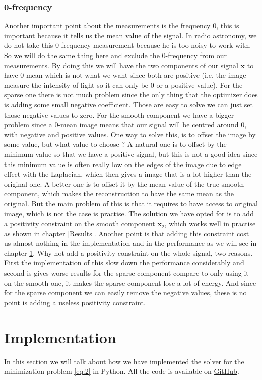 \documentclass[a4paper,11pt,oneside]{report}
\theoremstyle{named}
\begin{document}
\subsection{0-frequency}

Another important point about the measurements is the frequency 0, this is important because it tells us the mean value of the signal. In radio astronomy, we do not take this 0-frequency measurement because he is too noisy to work with. So we will do the same thing here and exclude the 0-frequency from our measurements. By doing this we will have the two components of our signal $\boldsymbol{x}$ to have 0-mean which is not what we want since both are positive (i.e. the image measure the intensity of light so it can only be 0 or a positive value). For the sparse one there is not much problem since the only thing that the optimizer does is adding some small negative coefficient. Those are easy to solve we can just set those negative values to zero. For the smooth component we have a bigger problem since a 0-mean image means that our signal will be centred around 0, with negative and positive values. One way to solve this, is to offset the image by some value, but what value to choose ? A natural one is to offset by the minimum value so that we have a positive signal, but this is not a good idea since this minimum value is often really low on the edges of the image due to edge effect with the Laplacian, which then gives a image that is a lot higher than the original one. A better one is to offset it by the mean value of the true smooth component, which makes the reconstruction to have the same mean as the original. But the main problem of this is that it requires to have access to original image, which is not the case is practise. The solution we have opted for is to add a positivity constraint on the smooth component $\boldsymbol{x}_2$, which works well in practise as shown in chapter \ref{Results}. Another point is that adding this constraint cost us almost nothing in the implementation and in the performance as we will see in chapter \ref{imp}. Why not add a positivity constraint on the whole signal, two reasons. First the implementation of this slow down the performance considerably and second is gives worse results for the sparse component compare to only using it on the smooth one, it makes the sparse component lose a lot of energy. And since for the sparse component we can easily remove the negative values, these is no point is adding a useless positivity constraint.

\chapter{Implementation}\label{imp}
In this section we will talk about how we have implemented the solver for the minimization problem \eqref{eq:2} in Python. All the code is available on \href{https://github.com/Dado0x/Sparse-smooth-signal}{GitHub}.
\end{document}
